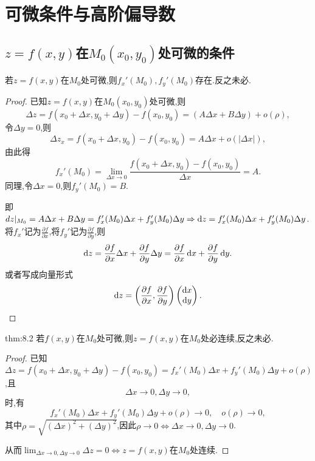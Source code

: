 \setcounter{chapter}{7}
\chapter{可微条件与高阶偏导数}

\section{$z = f(x,y)$在$M_0(x_0,y_0)$处可微的条件}

\begin{theorem}
    若$z = f(x,y)$在$M_0$处可微,则$f_x'(M_0),f_y'(M_0)$存在.反之未必.
\end{theorem}

\begin{proof}
    已知$z = f(x,y)$在$M_0(x_0,y_0)$处可微,则
    $$
    \Delta z = f(x_0 + \Delta x, y_0 + \Delta y) - f(x_0, y_0) = (A \Delta x + B \Delta y) + o(\rho),
    $$
    令$\Delta y = 0$,则
    $$
    \Delta z_x = f(x_0 + \Delta x, y_0) - f(x_0, y_0) = A \Delta x + o(|\Delta x|),
    $$
    由此得
    $$
    f_x'(M_0) = \lim_{\Delta x \to 0} \frac{f(x_0 + \Delta x, y_0) - f(x_0, y_0)}{\Delta x} = A.
    $$
    同理,令$\Delta x = 0$,则$f_y'(M_0) = B$.

    即$d z |_{M_0} = A \Delta x + B \Delta y = f_x'(M_0) \Delta x + f_y'(M_0) \Delta y \Rightarrow \operatorname{d\!} z = f_x'(M_0) \Delta x + f_y'(M_0) \Delta y$.
    将$f_x'$记为$\frac{\partial f}{\partial x}$,将$f_y'$记为$\frac{\partial f}{\partial y}$,则
    $$
    \operatorname{d\!} z = \frac{\partial f}{\partial x} \Delta x + \frac{\partial f}{\partial y} \Delta y = \frac{\partial f}{\partial x} \operatorname{d\!} x + \frac{\partial f}{\partial y} \operatorname{d\!} y.
    $$
    或者写成向量形式
    $$
    \operatorname{d\!} z = \left( \frac{\partial f}{\partial x}, \frac{\partial f}{\partial y} \right) \begin{pmatrix}
        \operatorname{d\!} x \\
        \operatorname{d\!} y
    \end{pmatrix}.
    $$
\end{proof}

\begin{theorem}{thm:8.2}
    若$f(x,y)$在$M_0$处可微,则$z = f(x,y)$在$M_0$处必连续,反之未必.
\end{theorem}

\begin{proof}
    已知$\Delta z = f(x_0 + \Delta x, y_0 + \Delta y) - f(x_0, y_0) = f_x'(M_0) \Delta x + f_y'(M_0) \Delta y + o(\rho)$,且
    $$
    \Delta x \to 0, \Delta y \to 0,
    $$
    时,有
    $$
    f_x'(M_0) \Delta x + f_y'(M_0) \Delta y + o(\rho) \to 0, \quad o(\rho) \to 0,
    $$
    其中$\rho = \sqrt{(\Delta x)^2 + (\Delta y)^2}$,因此$\rho \to 0 \Leftrightarrow \Delta x \to 0, \Delta y \to 0$.

    从而$\lim_{\Delta x \to 0, \Delta y \to 0} \Delta z = 0 \Leftrightarrow z = f(x,y)$在$M_0$处连续.
\end{proof}

